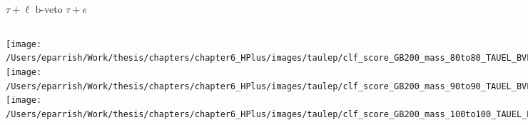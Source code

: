 \documentclass[aspectratio=169,xcolor=table]{beamer}
\begin{document}
    \begin{frame}[t]{$\tau+\ell$ b-veto $\tau+e$}
      \begin{columns}[t]
          \texttt{[image: /Users/eparrish/Work/thesis/chapters/chapter6\_HPlus/images/taulep/clf\_score\_GB200\_mass\_80to80\_TAUEL\_BVETO.png]}
          \texttt{[image: /Users/eparrish/Work/thesis/chapters/chapter6\_HPlus/images/taulep/clf\_score\_GB200\_mass\_90to90\_TAUEL\_BVETO.png]}
          \texttt{[image: /Users/eparrish/Work/thesis/chapters/chapter6\_HPlus/images/taulep/clf\_score\_GB200\_mass\_100to100\_TAUEL\_BVETO.png]}

          \texttt{[image: /Users/eparrish/Work/thesis/chapters/chapter6\_HPlus/images/taulep/clf\_score\_GB200\_mass\_110to110\_TAUEL\_BVETO.png]}
          \texttt{[image: /Users/eparrish/Work/thesis/chapters/chapter6\_HPlus/images/taulep/clf\_score\_GB200\_mass\_120to120\_TAUEL\_BVETO.png]}
          \texttt{[image: /Users/eparrish/Work/thesis/chapters/chapter6\_HPlus/images/taulep/clf\_score\_GB200\_mass\_130to130\_TAUEL\_BVETO.png]}
          \texttt{[image: /Users/eparrish/Work/thesis/chapters/chapter6\_HPlus/images/taulep/clf\_score\_GB200\_mass\_140to140\_TAUEL\_BVETO.png]}
          \texttt{[image: /Users/eparrish/Work/thesis/chapters/chapter6\_HPlus/images/taulep/clf\_score\_GB200\_mass\_150to150\_TAUEL\_BVETO.png]}
          \texttt{[image: /Users/eparrish/Work/thesis/chapters/chapter6\_HPlus/images/taulep/clf\_score\_GB200\_mass\_160to160\_TAUEL\_BVETO.png]}

          \texttt{[image: /Users/eparrish/Work/thesis/chapters/chapter6\_HPlus/images/taulep/clf\_score\_GB200\_mass\_170to170\_TAUEL\_BVETO.png]}
          \texttt{[image: /Users/eparrish/Work/thesis/chapters/chapter6\_HPlus/images/taulep/clf\_score\_GB200\_mass\_180to180\_TAUEL\_BVETO.png]}
          \texttt{[image: /Users/eparrish/Work/thesis/chapters/chapter6\_HPlus/images/taulep/clf\_score\_GB200\_mass\_190to190\_TAUEL\_BVETO.png]}

      \end{columns}
    \end{frame}
\end{document}

